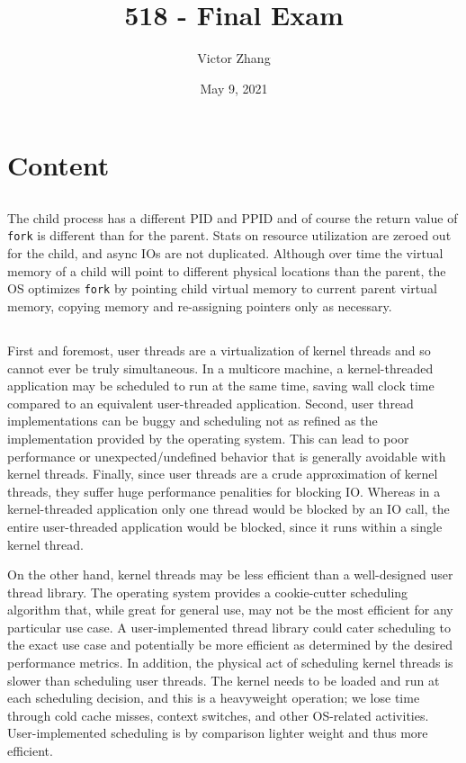 \documentclass{article}
\title{518 - Final Exam}
\author{Victor Zhang}
\date{May 9, 2021}
\begin{document}
\maketitle

\section{Content}
\setcounter{subsection}{-1}
\subsection{}
The child process has a different PID and PPID and of course the return value of \verb|fork| is different than for the parent. Stats on resource utilization are zeroed out for the child, and async IOs are not duplicated. Although over time the virtual memory of a child will point to different physical locations than the parent, the OS optimizes \verb|fork| by pointing child virtual memory to current parent virtual memory, copying memory and re-assigning pointers only as necessary.

\subsection{}
First and foremost, user threads are a virtualization of kernel threads and so cannot ever be truly simultaneous. In a multicore machine, a kernel-threaded application may be scheduled to run at the same time, saving wall clock time compared to an equivalent user-threaded application. Second, user thread implementations can be buggy and scheduling not as refined as the implementation provided by the operating system. This can lead to poor performance or unexpected/undefined behavior that is generally avoidable with kernel threads. Finally, since user threads are a crude approximation of kernel threads, they suffer huge performance penalities for blocking IO. Whereas in a kernel-threaded application only one thread would be blocked by an IO call, the entire user-threaded application would be blocked, since it runs within a single kernel thread.

On the other hand, kernel threads may be less efficient than a well-designed user thread library. The operating system provides a cookie-cutter scheduling algorithm that, while great for general use, may not be the most efficient for any particular use case. A user-implemented thread library could cater scheduling to the exact use case and potentially be more efficient as determined by the desired performance metrics. In addition, the physical act of scheduling kernel threads is slower than scheduling user threads. The kernel needs to be loaded and run at each scheduling decision, and this is a heavyweight operation; we lose time through cold cache misses, context switches, and other OS-related activities. User-implemented scheduling is by comparison lighter weight and thus more efficient.
\end{document}
